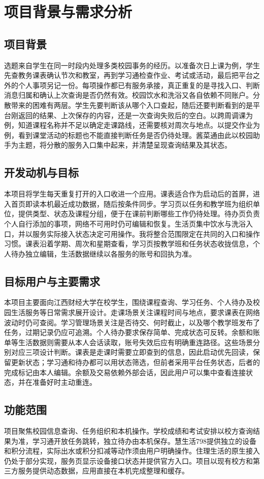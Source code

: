 \section{项目背景与需求分析}

\subsection{项目背景}
选题来自学生在同一时段内处理多类校园事务的经历。以准备次日上课为例，学生先查教务课表确认节次和教室，再到学习通检查作业、考试或活动，最后把平台之外的个人事项另记一份。每项操作都已有服务承接，真正重复的是寻找入口、判断消息归属和确认上次查询是否仍然有效。校园饮水和洗浴又各自依赖不同账户。分散带来的困难有两层。学生先要判断该从哪个入口查起，随后还要判断看到的是平台刚返回的结果、上次保存的内容，还是一次查询失败后的空白。以跨周调课为例，知道课程名称并不足以确定走课路线，还需要核对周次与地点。以提交作业为例，看到课堂活动的标题也不能直接判断任务是否仍待处理。酱菜通由此以校园助手为主题，将分散的服务入口集中起来，并清楚呈现查询结果及其状态。

\subsection{开发动机与目标}
本项目将学生每天重复打开的入口收进一个应用。课表适合作为启动后的首屏，进入首页即读本机最近成功数据，随后按条件同步。学习页以任务和教学班为组织单位，提供类型、状态及课程分组，便于在课前判断哪些工作仍待处理。待办页负责个人自行添加的事项，网络不可用时仍可编辑和恢复。生活页集中饮水与洗浴入口，并以服务实际接入状态决定可用操作。我将整合范围限定在共同的入口和操作习惯。课表沿着学期、周次和星期查看，学习页按教学班和任务状态收拢信息，个人待办独立编辑，生活数据继续以各服务的账号和回执为准。

\subsection{目标用户与主要需求}
本项目主要面向江西财经大学在校学生，围绕课程查询、学习任务、个人待办及校园生活服务等日常需求展开设计。走课场景关注课程时间与地点，要求课表在网络波动时仍可查阅。学习管理场景关注是否待交、何时截止，以及哪个教学班发布了任务，过期记录仍应可追溯。个人待办要求保存简单、完成状态可反转。余额和账单等生活数据则需要从本人会话读取，账号失效后应有明确重连路径。这些场景分别对应三项设计判断。课表是走课时需要立即查到的信息，因此启动优先回读，保留更新状态；学习通和待办都可以用状态筛选，但前者采用平台任务状态，后者的完成标记由本人编辑。余额及交易依赖外部会话，因此用户可以集中查看连接状态，并在准备好时主动重连。

\subsection{功能范围}
项目聚焦校园信息查询、任务组织和本机操作。学校成绩和考试安排以校方查询结果为准，学习通开放任务跳转，独立待办由本机保存。慧生活798提供独立的设备和积分流程，实际出水或积分扣减等动作须由用户明确操作。住理生活的原生接入仍处于部分实现，服务页显示设备接口状态并提供官方入口。项目以现有校方和第三方服务提供动态数据，应用直接在本机完成整理和缓存。
